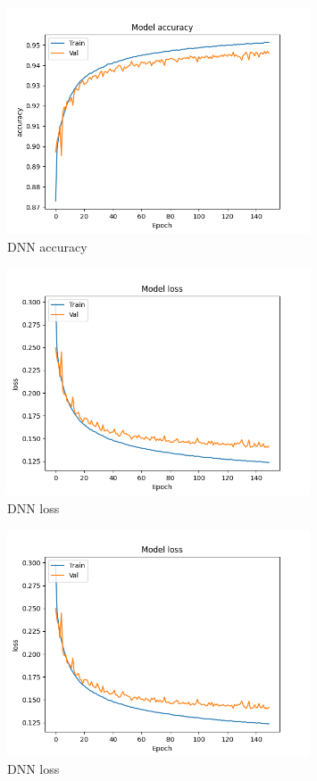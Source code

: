 \documentclass{article}
\begin{document}
    \begin{figure}[H]
        \centering
        \includegraphics[width=0.8\textwidth]{report_img/nn_results/feature_vector_dnn_26/metric_150_accuracy}
        \caption{DNN accuracy}
        \label{fig:}
    \end{figure}

    \begin{figure}[H]
        \centering
        \includegraphics[width=0.8\textwidth]{report_img/nn_results/feature_vector_dnn_26/metric_150_loss}
        \caption{DNN loss}
        \label{fig:}
    \end{figure}

    \begin{figure}[H]
        \centering
        \includegraphics[width=0.8\textwidth]{report_img/nn_results/feature_vector_dnn_26/metric_150_loss}
        \caption{DNN loss}
        \label{fig:}
    \end{figure}
\end{document}

